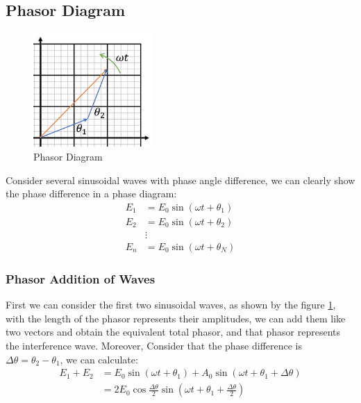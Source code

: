 \documentclass[openany]{book}
\begin{document}
\subsection{Phasor Diagram}
\begin{figure}
  \vspace{-20pt}
  \begin{center}
    \includegraphics[width=0.4\textwidth]{Figure/Phasor_1.PNG}
  \end{center}  
  \vspace{-20pt}
  \caption{Phasor Diagram}
  \vspace{-40pt}
  \label{fig:Phasor Diagram1}
\end{figure}
Consider several sinusoidal waves with phase angle difference, we can clearly show the phase difference in a phase diagram:
\begin{align*}
E_1&=E_0\sin \left(\omega t+\theta _1\right)\\
E_2&=E_0\sin \left(\omega t+\theta _2\right)\\
&\vdots\\
E_n&=E_0\sin \left(\omega t+\theta _N\right)
\end{align*}

\subsubsection{Phasor Addition of Waves}
First we can consider the first two sinusoidal waves, as shown by the figure \ref{fig:Phasor Diagram1}, with the length of the phasor represents their amplitudes, we can add them like two vectors and obtain the equivalent total phasor, and that phasor represents the interference wave. Moreover, Consider that the phase difference is $\Delta \theta =\theta _2-\theta _1$, we can calculate:
\begin{align*}
E_1+E_2&=E_0\sin \left(\omega t+\theta _1\right)+A_0\sin \left(\omega t+\theta _1+\Delta \theta \right)\\
&=2E_0\cos \frac{\Delta \theta }{2}\sin \left(\omega t+\theta _1+\frac{\Delta \theta}{2}\right)
\end{align*}
\end{document}
